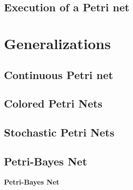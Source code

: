 \subsection{Execution of a Petri net}
\section{Generalizations}
\subsection{Continuous Petri net}
\subsection{Colored Petri Nets}
\subsection{Stochastic Petri Nets}
\subsection{Petri-Bayes Net}
{\bf Petri-Bayes Net}
%
